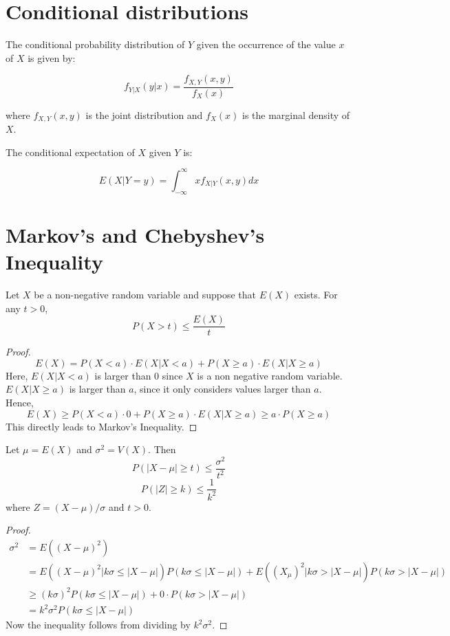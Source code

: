\documentclass[12pt,letterpaper]{book}
\theoremstyle{definition}
\begin{document}
\section{Conditional distributions}

The conditional probability distribution of $Y$ given the occurrence of the value $x$ of $X$ is given by:

\[ f_{Y|X} (y|x) = \frac{f_{X,Y}(x,y)}{f_X(x)}\]

where $f_{X,Y}(x,y)$ is the joint distribution and $f_X(x)$ is the marginal density of $X$.

The conditional expectation of $X$ given $Y$ is:

\[E(X|Y=y) = \int_{-\infty}^{\infty} x f_{X|Y}(x,y) dx \]

\section{Markov's and Chebyshev's Inequality}

\begin{theorem}
  Let $X$ be a non-negative random variable and suppose that $E(X)$ exists. For any $t > 0$, 
  \[P(X > t) \leq \frac{E(X)}{t}\]
\end{theorem}
\begin{proof}
  \[E(X) = P(X < a) \cdot E(X|X < a) + P(X \geq a) \cdot E(X|X \geq a)\] 
  Here, $E(X|X<a)$ is larger than 0 since $X$ is a non negative random variable. $E(X|X \geq a)$ is larger than $a$, since it only considers values larger than $a$. Hence,
  \[E(X) \geq P(X<a)\cdot 0 + P(X \geq a) \cdot E(X|X \geq a) \geq a \cdot P(X \geq a) \]
  This directly leads to Markov's Inequality.
\end{proof}

\begin{theorem}
  Let $\mu = E(X)$ and $\sigma^2 = V(X)$. Then
  \[P(|X-\mu| \geq t) \leq \frac{\sigma^2}{t^2}\]
  \[ P(|Z| \geq k) \leq \frac{1}{k^2}\]
  where $Z = (X-\mu) / \sigma$ and $t > 0$.
\end{theorem}
\begin{proof}
  \begin{align*}
    \sigma^2 &= E((X-\mu)^2)  \\
             &= E((X-\mu)^2 | k \sigma \leq |X-\mu|) P(k \sigma \leq |X - \mu|) + E((X_\mu)^2 | k \sigma > |X-\mu|)P(k\sigma > |X - \mu|) \\
             &\geq (k \sigma)^2 P(k \sigma \leq |X-\mu|) + 0 \cdot P(k \sigma > |X-\mu|) \\
             &= k^2 \sigma^2 P(k \sigma \leq |X-\mu|)
  \end{align*} 
  Now the inequality follows from dividing by $k^2 \sigma^2$.
\end{proof}
\end{document}
